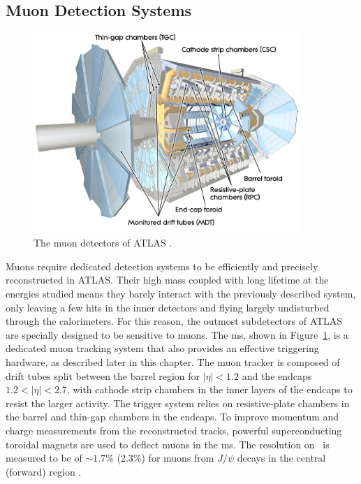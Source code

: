 \subsection{Muon Detection Systems}
\begin{figure}[!h]
  \centering
  \includegraphics[width=0.9\textwidth]{Images/ATLAS/ATLASMuon.jpg}
  \caption{The muon detectors of ATLAS \cite{ATLASschematics}.}
  \label{fig-AtlasDecMuon}
\end{figure}
Muons require dedicated detection systems to be efficiently and precisely reconstructed in ATLAS. Their high mass coupled with long lifetime at the energies studied means they barely interact with the previously described system, only leaving a few hits in the inner detectors and flying largely undisturbed through the calorimeters. For this reason, the outmost subdetectors of ATLAS are specially designed to be sensitive to muons. The \gls{ms}, shown in Figure~\ref{fig-AtlasDecMuon}, is a dedicated muon tracking system that also provides an effective triggering hardware, as described later in this chapter. The muon tracker is composed of drift tubes split between the barrel region for $|\eta| < 1.2$ and the endcaps $1.2 < |\eta| < 2.7$, with cathode strip chambers in the inner layers of the endcaps to resist the larger activity. The trigger system relies on resistive-plate chambers in the barrel and thin-gap chambers in the endcaps. To improve momentum and charge measurements from the reconstructed tracks, powerful superconducting toroidal magnets are used to deflect muons in the \gls{ms}. The resolution on \pt\ is measured to be of $\sim 1.7$\% (2.3\%) for muons from $J/\psi$ decays in the central (forward) region \cite{atlasMuonPTReco}.

